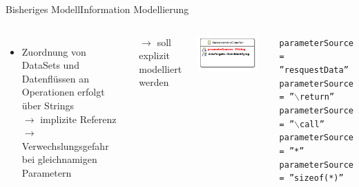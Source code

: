 \documentclass{sdqbeamer}
\begin{document}
\begin{frame}{Bisheriges Modell}{Information Modellierung}
		\begin{columns}
		\begin{itemize}
			\item Zuordnung von DataSets und Datenflüssen an Operationen erfolgt über Strings\\
			$\rightarrow$ implizite Referenz\\
			$\rightarrow$ Verwechslungsgefahr bei gleichnamigen Parametern
		\end{itemize}
		$\rightarrow$ soll explizit modelliert werden
		\begin{center}
			\includegraphics[width=0.9\textwidth]{images/ParameterAndDataPair.pdf}
		\end{center}
		\vspace{0.02\textheight}
		\texttt{parameterSource = ''resquestData''}\\
		\texttt{parameterSource = ''$\backslash$return''}\\
		\texttt{parameterSource = ''$\backslash$call''}\\
		\texttt{parameterSource = ''*''}\\
		\texttt{parameterSource = ''sizeof(*)''}
	\end{columns}	
\end{frame}
\end{document}
